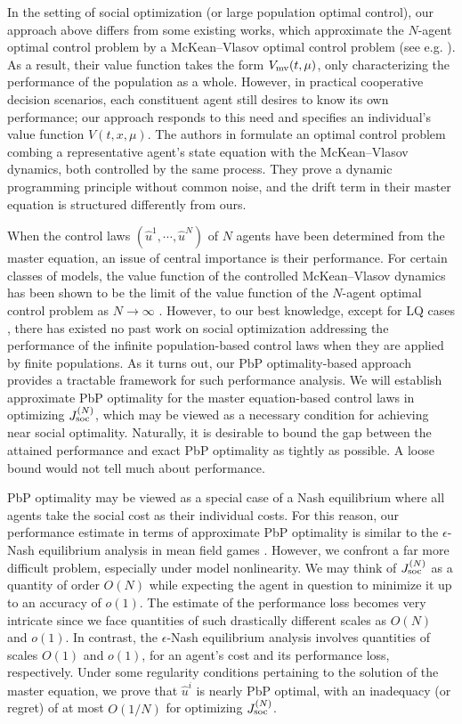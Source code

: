 \documentclass{amsart}
\theoremstyle{definition}
\theoremstyle{remark}
\numberwithin{equation}{section}
\begin{document}
In the setting of social optimization (or large population optimal control), our approach above differs from some existing works, which approximate the $N$-agent optimal control problem by a McKean--Vlasov optimal control problem (see e.g. \cite{DPT22,DPT20,L17,WZ20}). As a result, their value function takes the form ${V}_{\rm mv}(t, \mu)$, only characterizing the performance of the population as a whole. However, in  practical cooperative decision scenarios, each constituent agent still desires to know its own performance; our approach responds to this need and specifies an individual's value function $V(t,x,\mu)$.
The authors in \cite{BCP18} formulate an optimal control problem combing a representative agent's state equation with the McKean--Vlasov dynamics, both controlled by the same process. They prove a dynamic programming principle without common noise, and the drift term in their master equation is structured differently from ours.



When the control laws $(\hat u^1, \cdots, \hat u^N)$ of $N$ agents have been determined from the master equation, an issue of central importance is their performance.
 For certain classes of models, the value function of the controlled McKean--Vlasov dynamics has been shown to be the limit of the value function of the $N$-agent optimal control problem as $N\to \infty$ \cite{CDJS22,DPT22}. However,
to our best knowledge, except  for LQ cases \cite{FHH23,HCM12,HN16,WZ17}, there has existed no past work on social optimization addressing the performance of the infinite population-based control laws when they are applied by finite populations. As it turns out, our PbP optimality-based approach provides a tractable framework for such performance analysis.
 We will establish  approximate PbP optimality  for the master equation-based control laws in optimizing $J^{(N)}_{\rm soc}$, which may be viewed as a necessary condition for achieving near social optimality. Naturally, it is desirable to bound the gap between the attained performance and exact PbP optimality as tightly as possible. A loose bound would not tell much about performance.

PbP optimality may be viewed as a special case of a Nash equilibrium where all agents take the social cost as their individual costs. For this reason, our performance estimate in terms of approximate PbP optimality is similar to the $\epsilon$-Nash equilibrium analysis in mean field games \cite{CHM17}. However, we confront a far more difficult problem, especially under model nonlinearity.    We may think of $J^{(N)}_{\rm soc}$ as a quantity of order $O(N)$ while expecting the agent in question  to minimize it up to an accuracy of $o(1)$.
   The estimate of the performance loss becomes very intricate since we face quantities of such drastically different scales as $O(N)$ and $o(1)$. In contrast, the $\epsilon$-Nash equilibrium analysis involves quantities of scales $O(1)$ and $o(1)$, for an agent's cost and its performance loss, respectively.
 Under some regularity  conditions pertaining to the solution of the master equation, we prove that
$\hat u^i$ is nearly PbP optimal, with an inadequacy (or regret) of at most $O(1/N)$ for optimizing $J^{(N)}_{\rm soc}$.
\end{document}
